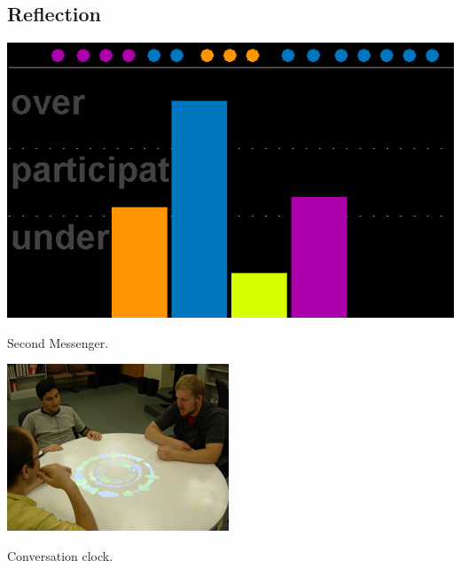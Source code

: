 \documentclass{tufte-handout}
\begin{document}

\subsection{Reflection}

\begin{marginfigure}
	\includegraphics{figures/second-messenger.png}
	\caption{Second Messenger.}
	\label{fig:second-messenger}
\end{marginfigure}


\begin{marginfigure}
	\includegraphics{figures/conversation_clock.png}
	\caption{Conversation clock.}
	\label{fig:conversation-clock}
\end{marginfigure}
\end{document}
